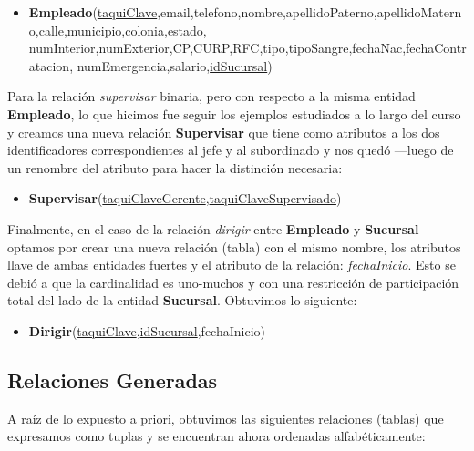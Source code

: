 \documentclass[11pt,letterpaper]{article}
\begin{document}
\begin{itemize}
\item \footnotesize{\textbf{Empleado}(\underline{taquiClave},email,telefono,nombre,apellidoPaterno,apellidoMaterno,calle,municipio,colonia,estado,
numInterior,numExterior,CP,CURP,RFC,tipo,tipoSangre,fechaNac,fechaContratacion,
numEmergencia,salario,\underline{idSucursal})}
\end{itemize}

Para la relación \textit{supervisar} binaria, pero con respecto a la misma entidad \textbf{Empleado}, lo que hicimos fue seguir los ejemplos estudiados a lo largo del curso y creamos una nueva relación \textbf{Supervisar} que tiene como atributos a los dos identificadores correspondientes al jefe y al subordinado y nos quedó ---luego de un renombre del atributo para hacer la distinción necesaria:

\begin{itemize}
\item \footnotesize{\textbf{Supervisar}(\underline{taquiClaveGerente},\underline{taquiClaveSupervisado})}
\end{itemize}

Finalmente, en el caso de la relación \textit{dirigir} entre \textbf{Empleado} y \textbf{Sucursal} optamos por crear una nueva relación (tabla) con el mismo nombre, los atributos llave de ambas entidades fuertes y el atributo de la relación: \textit{fechaInicio}. Esto se debió a que la cardinalidad es uno-muchos y con una restricción de participación total del lado de la entidad \textbf{Sucursal}. Obtuvimos lo siguiente:

\begin{itemize}
\item \footnotesize{\textbf{Dirigir}(\underline{taquiClave},\underline{idSucursal},fechaInicio)}
\end{itemize}

\subsection{Relaciones Generadas}

A raíz de lo expuesto a priori, obtuvimos las siguientes relaciones (tablas) que expresamos como tuplas y se encuentran ahora ordenadas alfabéticamente:
\end{document}
